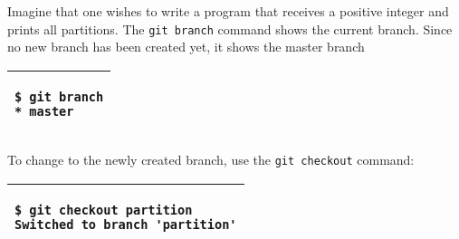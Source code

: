 
Imagine that one wishes to write a program that receives a positive
integer and prints all partitions.  The {\tt git branch} command shows
the current branch. Since no new branch has been created yet, it shows
the master branch

\vspace{0.2in}
\noindent
\begin{tabular}{|p{5in}|}\hline
\begin{verbatim}
$ git branch
* master
\end{verbatim}
\\ \hline
\end{tabular}
\vspace{0.2in}

If a name is given after {\tt git branch}, a new branch is
created. The following command creates a new branch called {\tt
  partition}.

\vspace{0.2in}
\noindent
\begin{tabular}{|p{5in}|}\hline
\begin{verbatim}
$ git branch partition
\end{verbatim}
\\ \hline
\end{tabular}
\vspace{0.2in}

To change to the newly created branch, use the {\tt git checkout} command:

\vspace{0.2in}
\noindent
\begin{tabular}{|p{5in}|}\hline
\begin{verbatim}
$ git checkout partition
Switched to branch 'partition'
\end{verbatim}
\\ \hline
\end{tabular}
\vspace{0.2in}

The {\tt git branch} command shows two branches and
the current working branch is called {\tt partition}.

\vspace{0.2in}
\noindent
\begin{tabular}{|p{5in}|}\hline
\begin{verbatim}
$ git branch
  master
* partition
\end{verbatim}
\\ \hline
\end{tabular}
\vspace{0.2in}

